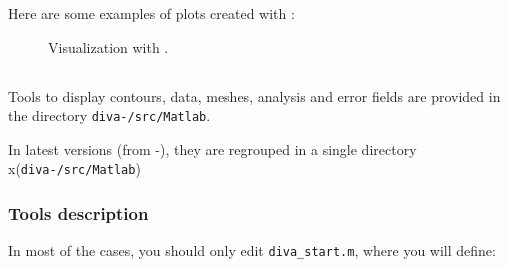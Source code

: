 Here are some examples of plots created with \gnuplot:

\begin{figure}[htpb]
\centering
{}

\caption{Visualization with \gnuplot.\label{fig:gnuplotexamples}}
\end{figure}


\subsection{\matlab}


Tools to display contours, data, meshes, analysis and error fields are provided in the directory \texttt{diva-\divaversion/src/Matlab}. 


In latest versions (from \diva-\divaversion), they are regrouped in a single directory\\
x(\texttt{diva-\divaversion/src/Matlab})



\subsubsection{Tools description}

In most of the cases, you should only edit \texttt{diva\_start.m}, where you will define:

